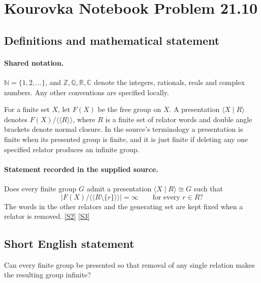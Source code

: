 \documentclass[11pt]{article}
\newcommand{\sref}[2]{\hyperlink{source:#1:#2}{[S#2]}}
\begin{document}
\section{Kourovka Notebook Problem 21.10}\label{statement}

\subsection{Definitions and mathematical statement}

\paragraph{Shared notation.}$\mathbb N=\{1,2,\ldots\}$, and $\mathbb Z,\mathbb Q,\mathbb R,\mathbb C$ denote the integers, rationals, reals and complex numbers. Any other conventions are specified locally.


For a finite set $X$, let $F(X)$ be the free group on $X$. A presentation $\langle X\mid R\rangle$ denotes $F(X)/\langle\!\langle R\rangle\!\rangle$, where $R$ is a finite set of relator words and double angle brackets denote normal closure. In the source's terminology a presentation is finite when its presented group is finite, and it is just finite if deleting any one specified relator produces an infinite group.
\paragraph{Statement recorded in the supplied source.}
Does every finite group $G$ admit a presentation $\langle X\mid R\rangle\cong G$ such that
\[
 \bigl|F(X)/\langle\!\langle R\setminus\{r\}\rangle\!\rangle\bigr|=\infty
 \qquad\text{for every }r\in R?
\]
The words in the other relators and the generating set are kept fixed when a relator is removed. \sref{statement}{2} \sref{statement}{3}
\subsection{Short English statement}
Can every finite group be presented so that removal of any single relation makes the resulting group infinite?
\end{document}
